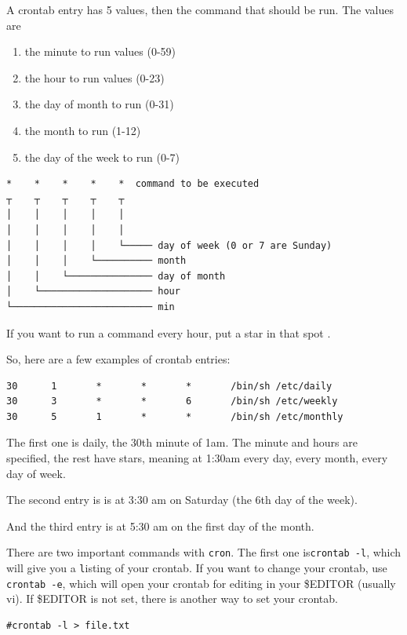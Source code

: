 A crontab entry has 5 values, then the command that should be run. 
The  values are 
\begin{enumerate}
    \item the minute to run values (0-59)
    \item the hour to run values (0-23)
    \item the day of month to run (0-31)
    \item the month to run (1-12)
    \item the day of the week to run (0-7)
\end{enumerate}

\begin{verbatim}
*    *    *    *    *  command to be executed
┬    ┬    ┬    ┬    ┬
│    │    │    │    │
│    │    │    │    │
│    │    │    │    └───── day of week (0 or 7 are Sunday)
│    │    │    └────────── month
│    │    └─────────────── day of month
│    └──────────────────── hour
└───────────────────────── min
\end{verbatim}

If you want to run a command every hour, put a star in that spot {\tt *}.

So, here are a few examples of crontab entries:

\begin{verbatim}
30      1       *       *       *       /bin/sh /etc/daily
30      3       *       *       6       /bin/sh /etc/weekly
30      5       1       *       *       /bin/sh /etc/monthly
\end{verbatim}

The first one is daily, the 30th minute of 1am. The
minute and hours are specified, the rest have stars, meaning at 1:30am 
every day, every month, every day of week.

The second entry is is at 3:30 am on Saturday (the 6th day of the week).

And the third entry is at 5:30 am on the first day of the month. 

There are two important commands with {\tt cron}. The first one is{\tt crontab -l},
which will give you a {\tt l}isting of your crontab.  If you want to change your 
crontab, use {\tt crontab -e}, which will open your crontab for editing in your 
\$EDITOR (usually vi). If \$EDITOR is not set, there is another way to set your crontab.

\begin{verbatim}
#crontab -l > file.txt
\end{verbatim}

